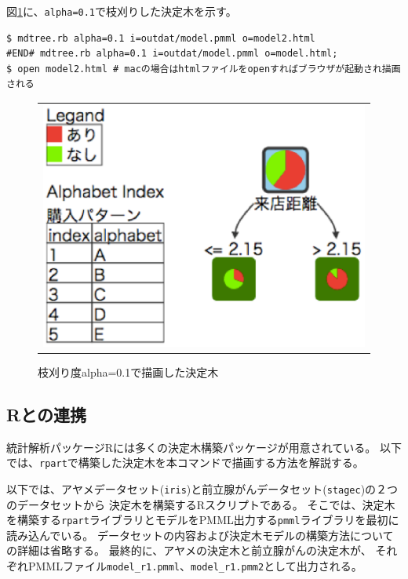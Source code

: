 図\ref{fig:mdtree_tree_2}に、\verb|alpha=0.1|で枝刈りした決定木を示す。
\begin{Verbatim}[baselinestretch=0.7,frame=single]
$ mdtree.rb alpha=0.1 i=outdat/model.pmml o=model2.html
#END# mdtree.rb alpha=0.1 i=outdat/model.pmml o=model.html;
$ open model2.html # macの場合はhtmlファイルをopenすればブラウザが起動され描画される
\end{Verbatim}

\begin{figure}[htbp]
\begin{center}
\begin{tabular}{c}

\begin{minipage}{0.5\hsize}
\begin{center}
\includegraphics[scale=0.5]{figure/tree_2.eps}
\caption{枝刈り度alpha=0.1で描画した決定木\label{fig:mdtree_tree_2}}
\end{center}
\end{minipage}

\end{tabular}
\end{center}
\end{figure}

\subsection{Rとの連携}
統計解析パッケージRには多くの決定木構築パッケージが用意されている。
以下では、\verb|rpart|で構築した決定木を本コマンドで描画する方法を解説する。

以下では、アヤメデータセット(\verb|iris|)と前立腺がんデータセット(\verb|stagec|)の２つのデータセットから
決定木を構築するRスクリプトである。
そこでは、決定木を構築する\verb|rpart|ライブラリとモデルをPMML出力する\verb|pmml|ライブラリを最初に読み込んでいる。
データセットの内容および決定木モデルの構築方法についての詳細は省略する。
最終的に、アヤメの決定木と前立腺がんの決定木が、
それぞれPMMLファイル\verb|model_r1.pmml|、\verb|model_r1.pmm2|として出力される。

